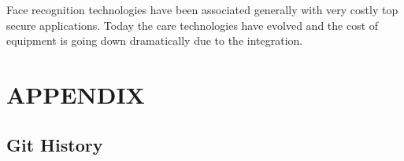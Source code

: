 \documentclass[a4paper, 12pt]{report}
\begin{document}
Face recognition technologies have been associated generally with very costly top secure
applications. Today the care technologies have evolved and the cost of equipment is going down
dramatically due to the integration.















\newpage
\section{APPENDIX}
\subsection{Git History }	
		\fontsize{12pt}{12pt}\selectfont
				
\end{document}
